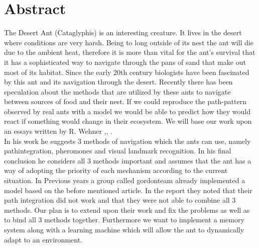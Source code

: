 \documentclass[11pt]{article}
\begin{document}



\tableofcontents

\newpage




\section{Abstract}
The Desert Ant (Cataglyphis) is an interesting creature. It lives in the desert where conditions are very harsh. Being to long outside of its nest the ant will die due to the ambient heat, therefore it is more than vital for the ant's survival that it has a sophisticated way to navigate through the pans of sand that make out most of its habitat. Since the early 20th century biologists have been fascinated by this ant and its navigation through the desert. Recently there has been speculation about the methods that are utilized by these ants to navigate between sources of food and their nest. If we could reproduce the path-pattern observed by real ants with a model we would be able to predict how they would react if something would change in their ecosystem.
We will base our work upon an essays written by R. Wehner \cite{Wehner2003},\cite{Wehner1988}, \cite{Wehner1998}.\\
 In his work he suggests 3 methods of navigation which the ants can use, namely pathintegration, pheromones and visual landmark recognition. In his final conclusion he considers all 3 methods important and assumes that the ant has a way of adopting the priority of each mechanism according to the current situation.
In Previous years a group called gordonteam\cite{GordonTeam2008} already implemented a model based on the before mentioned article. In the report they noted that their path integration did not work and that they were not able to combine all 3 methods. Our plan is to extend upon their work and fix the problems as well as to bind all 3 methods together. Furthermore we want to implement a memory system along with a learning machine which will allow the ant to dynamically adapt to an environment.
\end{document}
